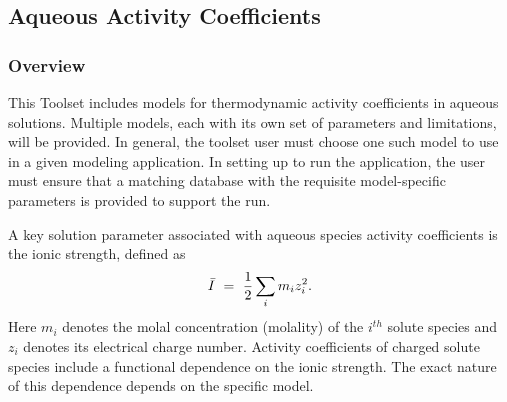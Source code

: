 \subsection{Aqueous Activity Coefficients}   \label{sec:AqueousActivityCoefficients}

\subsubsection{Overview}

This Toolset
includes models for thermodynamic activity coefficients
in aqueous solutions. Multiple models, each with its own set of
parameters and limitations, will be provided. In general, the toolset
user must choose one such model to use in a given modeling
application. In setting up to run the application, the user must
ensure that a matching database with the requisite model-specific
parameters is provided to support the run.

A key solution parameter associated with aqueous species activity
coefficients is the ionic strength, defined as
\begin{equation}
  \label{eq:IonicStrength}
\bar{I} \ =\  \frac{1}{2} \sum _{i} m_{i} z_{i}^{2}.
\end{equation}
Here $m_{i}$ denotes the molal concentration (molality) of the
$i^{th}$ solute species and $z_{i}$ denotes its electrical charge
number. Activity coefficients of charged solute species include a
functional dependence on the ionic strength. The exact nature of this
dependence depends on the specific model.

